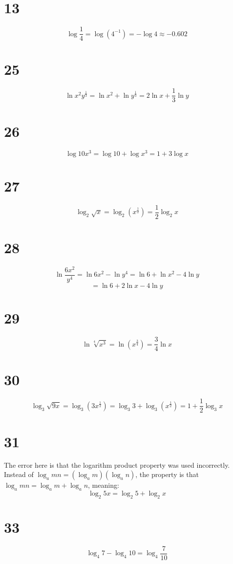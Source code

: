\documentclass{article}
\theoremstyle{definition}
\newcommand{\?}{\stackrel{?}{=}}
\begin{document}
\section*{13}
\[ \log \frac{1}{4}=\log (4^{-1})=-\log 4\approx -0.602 \]

\section*{25}
\[ \ln x^2y^\frac{1}{3}=\ln x^2+\ln y^\frac{1}{3}=2\ln x+\frac{1}{3}\ln y \]

\section*{26}
\[ \log 10x^3=\log 10+\log x^3=1+3\log x \]

\section*{27}
\[ \log_2 \sqrt{x}=\log_2 (x^\frac{1}{2})=\frac{1}{2}\log_2 x \]

\section*{28}
\[ \ln\dfrac{6x^2}{y^4}=\ln 6x^2-\ln y^4=\ln 6+\ln x^2-4\ln y \] \[ =\ln 6+2\ln x-4\ln y \]

\section*{29}
\[ \ln \sqrt[4]{x^3}=\ln (x^\frac{3}{4})=\frac{3}{4}\ln x \]

\section*{30}
\[ \log_3 \sqrt{9x} =\log_3 (3x^\frac{1}{2})=\log_3 3+\log_3 \left( x^\frac{1}{2}\right )=1+\frac{1}{2}\log_3 x \] 

\section*{31}
The error here is that the logarithm product property was used incorrectly. Instead of $\log_a mn=(\log_a m)(\log_a n)$, the property is that 
$\log_a mn=\log_a m+\log_a n$, meaning: \[ \log_2 5x=\log_2 5+\log_2 x \]

\section*{33}
\[ \log_4 7-\log_4 10=\log_4\frac{7}{10} \]
\end{document}
